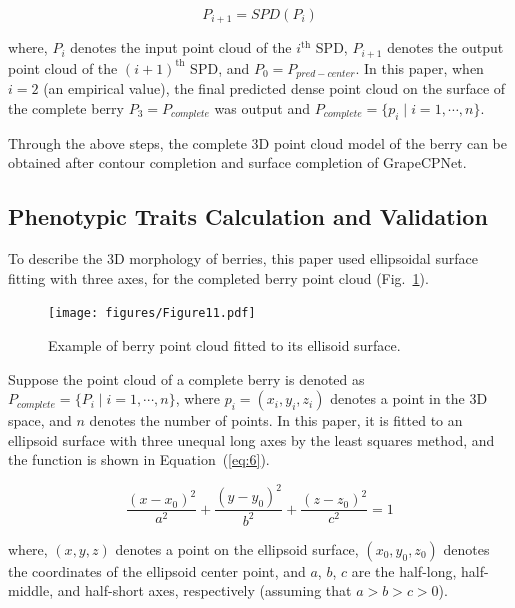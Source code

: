 \documentclass[12pt]{article}
\begin{document}
\begin{equation}
    P_{i+1} = SPD(P_i)
    \label{eq:5}
\end{equation}

{\raggedright where, $P_i$ denotes the input point cloud of the $i^{\text{th}}$ SPD, $P_{i+1}$ denotes the output point cloud of the $(i+1)^{\text{th}}$ SPD, and $P_0=P_{pred-center}$. 
In this paper, when $i=2$ (an empirical value), the final predicted dense point cloud on the surface of the complete berry $P_3=P_{complete}$ was output and $P_{complete}=\{p_i \mid i=1,\cdots,n\}$.}

Through the above steps, the complete 3D point cloud model of the berry can be obtained after contour completion and surface completion of GrapeCPNet.

\subsection{Phenotypic Traits Calculation and Validation}

To describe the 3D morphology of berries, this paper used ellipsoidal surface fitting with three axes, for the completed berry point cloud (Fig.~\ref{fig:raw16}).

\begin{figure}[hbt!]
    \centering
    \texttt{[image: figures/Figure11.pdf]}
    \caption{Example of berry point cloud fitted to its ellisoid surface.}
    \label{fig:raw16}
\end{figure}


Suppose the point cloud of a complete berry is denoted as $P_{complete}=\{P_i \mid i=1, \cdots,n\}$, where $p_i=(x_i,y_i,z_i)$ denotes a point in the 3D space, and $n$ denotes the number of points. 
In this paper, it is fitted to an ellipsoid surface with three unequal long axes by the least squares method, and the function is shown in Equation~(\ref{eq:6}).

\begin{equation}
    \frac{(x-x_0)^2}{a^2} + \frac{(y-y_0)^2}{b^2} + \frac{(z-z_0)^2}{c^2} = 1
    \label{eq:6}
\end{equation}

{\raggedright where, $(x,y,z)$ denotes a point on the ellipsoid surface, $(x_0,y_0,z_0)$ denotes the coordinates of the ellipsoid center point, and $a$, $b$, $c$ are the half-long, half-middle, and half-short axes, respectively (assuming that $a>b>c>0$). }
\end{document}
